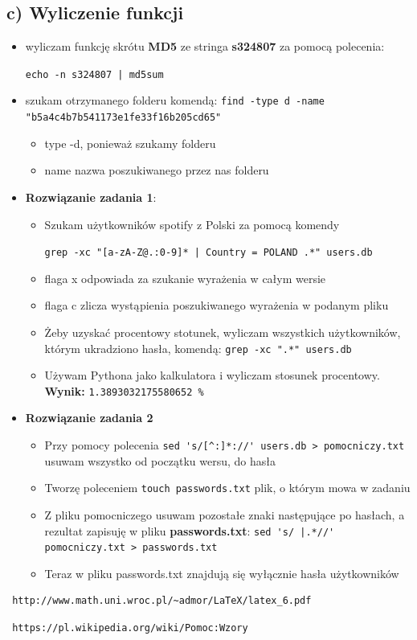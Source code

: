 \documentclass[a4paper, 11pt]{article}
\begin{document}
\subsection*{c) Wyliczenie funkcji}
\begin{itemize}
\item wyliczam funkcję skrótu {\bf MD5} ze stringa {\bf s324807} za pomocą polecenia:

\verb+echo -n s324807 | md5sum+
\item szukam otrzymanego folderu komendą:
\verb+find -type d -name "b5a4c4b7b541173e1fe33f16b205cd65"+
\begin{itemize}
\item \textsf{type -d}, ponieważ szukamy folderu
\item \textsf{name} nazwa poszukiwanego przez nas folderu 
\end{itemize}
\item {\bf Rozwiązanie zadania 1}:
\begin{itemize}
\item Szukam użytkowników spotify z Polski za pomocą komendy

\verb+grep -xc "[a-zA-Z@.:0-9]* | Country = POLAND .*" users.db+
\item flaga \textsf{x} odpowiada za szukanie wyrażenia w całym wersie
\item flaga \textsf{c} zlicza wystąpienia poszukiwanego wyrażenia w podanym pliku 
\item Żeby uzyskać procentowy stotunek, wyliczam wszystkich użytkowników, którym ukradziono hasła, komendą:
\verb+grep -xc ".*" users.db+
\item Używam Pythona jako kalkulatora i wyliczam stosunek procentowy.\\
{\bf Wynik:} \verb+1.3893032175580652 %+
\end{itemize}
\newpage
\item {\bf Rozwiązanie zadania 2}
\begin{itemize}
\item Przy pomocy polecenia \verb+sed 's/[^:]*://' users.db > pomocniczy.txt+ usuwam wszystko od początku wersu, do hasła 
\item Tworzę poleceniem \verb+touch passwords.txt+ plik, o którym mowa w zadaniu
\item Z pliku pomocniczego usuwam pozostałe znaki następujące po hasłach, a rezultat zapisuję w pliku {\bf passwords.txt}:
\verb+sed 's/ |.*//' pomocniczy.txt > passwords.txt+
\item Teraz w pliku passwords.txt znajdują się wyłącznie hasła użytkowników 
\end{itemize}
\end{itemize}


\begin{thebibliography}{3}
\bibitem{}
 \begin{verbatim}
 http://www.math.uni.wroc.pl/~admor/LaTeX/latex_6.pdf
 \end{verbatim}
\bibitem{}
 \begin{verbatim}
 https://pl.wikipedia.org/wiki/Pomoc:Wzory
 \end{verbatim}

\end{thebibliography}
\end{document}
